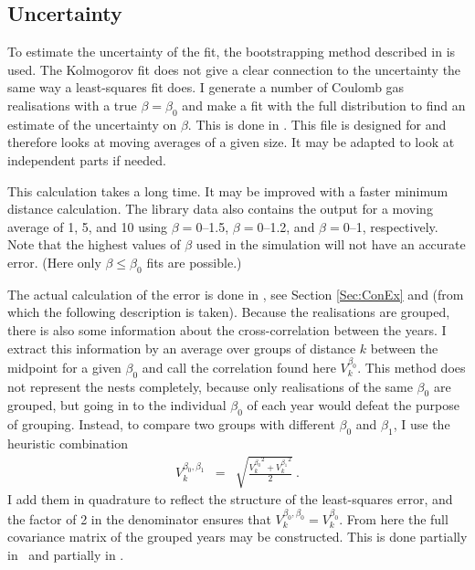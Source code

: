 \documentclass[a4paper,11pt]{article}
\numberwithin{equation}{section}
\begin{document}
\subsection{Uncertainty}\label{Sec:Uncertainty}
To estimate the uncertainty of the fit, the bootstrapping method described in \cite{Buzzard} is used.
The Kolmogorov fit does not give a clear connection to the uncertainty the same way a least-squares fit does. I generate a number of Coulomb gas realisations with a true $\beta=\beta_0$ and make a fit with the full distribution to find an estimate of the uncertainty on $\beta$. This is done in \fileBetaUncertainty. This file is designed for \cite{Buzzard} and therefore looks at moving averages of a given size. It may be adapted to look at independent parts if needed.

This calculation takes a long time. It may be improved with a faster minimum distance calculation. The library data also contains the output for a moving average of 1, 5, and 10 using $\beta= 0$--1.5, $\beta= 0$--1.2, and $\beta= 0$--1, respectively. Note that the highest values of $\beta$ used in the simulation will not have an accurate error. (Here only $\beta\leq \beta_0$ fits are possible.)

The actual calculation of the error is done in \fileBuzzardRead, see Section \ref{Sec:ConEx} and \cite{Buzzard} (from which the following description is taken). Because the realisations are grouped, there is also some information about the cross-correlation between the years. I extract this information by an average over groups of distance $k$ between the midpoint for a given $\beta_0$ and call the correlation found here $V^{\beta_0}_k$. This method does not represent the nests completely, because only realisations of the same $\beta_0$ are grouped, but going in to the individual $\beta_0$ of each year would defeat the purpose of grouping. Instead, to compare two groups with different $\beta_0$ and $\beta_1$, I use the heuristic combination
\begin{eqnarray}
V^{\beta_0,\beta_1}_k &=& \sqrt{\frac{{V^{\beta_0}_k}^2 + {V^{\beta_1}_k}^2}{2}}\ .
\end{eqnarray}
I add them in quadrature to reflect the structure of the least-squares error, and the factor of 2 in the denominator ensures that $V^{\beta_0,\beta_0}_k = V^{\beta_0}_k$. From here the full covariance matrix of the grouped years may be constructed.
This is done partially in \fileBuzzardRead\ and partially in \fileCovCon.
\end{document}
